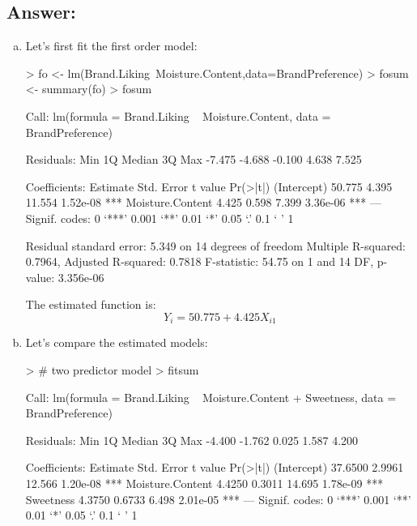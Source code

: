 \documentclass{article}
\begin{document}
\subsection{Answer:}

\begin{enumerate}[a)]
\item{} Let's first fit the first order model:

\begin{Schunk}
\begin{Sinput}
> fo <- lm(Brand.Liking~Moisture.Content,data=BrandPreference)
> fosum <- summary(fo)
> fosum
\end{Sinput}
\begin{Soutput}
Call:
lm(formula = Brand.Liking ~ Moisture.Content, data = BrandPreference)

Residuals:
   Min     1Q Median     3Q    Max 
-7.475 -4.688 -0.100  4.638  7.525 

Coefficients:
                 Estimate Std. Error t value Pr(>|t|)    
(Intercept)        50.775      4.395  11.554 1.52e-08 ***
Moisture.Content    4.425      0.598   7.399 3.36e-06 ***
---
Signif. codes:  0 ‘***’ 0.001 ‘**’ 0.01 ‘*’ 0.05 ‘.’ 0.1 ‘ ’ 1

Residual standard error: 5.349 on 14 degrees of freedom
Multiple R-squared:  0.7964,	Adjusted R-squared:  0.7818 
F-statistic: 54.75 on 1 and 14 DF,  p-value: 3.356e-06
\end{Soutput}
\end{Schunk}

The estimated function is:
$$ Y_i = 50.775 + 4.425X_{i1} $$

\item{} Let's compare the estimated models:

\begin{Schunk}
\begin{Sinput}
> # two predictor model
> fitsum
\end{Sinput}
\begin{Soutput}
Call:
lm(formula = Brand.Liking ~ Moisture.Content + Sweetness, data = BrandPreference)

Residuals:
   Min     1Q Median     3Q    Max 
-4.400 -1.762  0.025  1.587  4.200 

Coefficients:
                 Estimate Std. Error t value Pr(>|t|)    
(Intercept)       37.6500     2.9961  12.566 1.20e-08 ***
Moisture.Content   4.4250     0.3011  14.695 1.78e-09 ***
Sweetness          4.3750     0.6733   6.498 2.01e-05 ***
---
Signif. codes:  0 ‘***’ 0.001 ‘**’ 0.01 ‘*’ 0.05 ‘.’ 0.1 ‘ ’ 1


\end{Soutput}
\end{Schunk}
\end{enumerate}
\end{document}
